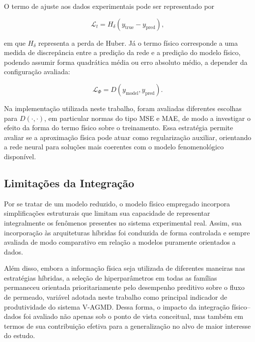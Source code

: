 O termo de ajuste aos dados experimentais pode ser representado por

\begin{equation}
\mathcal{L}_{t} = H_{\delta}(y_{\text{true}} - y_{\text{pred}}),
\end{equation}

\noindent em que \(H_{\delta}\) representa a perda de Huber. Já o termo físico corresponde a uma medida de discrepância entre a predição da rede e a predição do modelo físico, podendo assumir forma quadrática média ou erro absoluto médio, a depender da configuração avaliada:

\begin{equation}
\mathcal{L}_{\Phi} = D(y_{\text{model}}, y_{\text{pred}}).
\end{equation}

Na implementação utilizada neste trabalho, foram avaliadas diferentes escolhas para \(D(\cdot,\cdot)\), em particular normas do tipo MSE e MAE, de modo a investigar o efeito da forma do termo físico sobre o treinamento. Essa estratégia permite avaliar se a aproximação física pode atuar como regularização auxiliar, orientando a rede neural para soluções mais coerentes com o modelo fenomenológico disponível.
\subsection{Limitações da Integração}

Por se tratar de um modelo reduzido, o modelo físico empregado incorpora simplificações estruturais que limitam sua capacidade de representar integralmente os fenômenos presentes no sistema experimental real. Assim, sua incorporação às arquiteturas híbridas foi conduzida de forma controlada e sempre avaliada de modo comparativo em relação a modelos puramente orientados a dados.

Além disso, embora a informação física seja utilizada de diferentes maneiras nas estratégias híbridas, a seleção de hiperparâmetros em todas as famílias permaneceu orientada prioritariamente pelo desempenho preditivo sobre o fluxo de permeado, variável adotada neste trabalho como principal indicador de produtividade do sistema V-AGMD. Dessa forma, o impacto da integração físico--dados foi avaliado não apenas sob o ponto de vista conceitual, mas também em termos de sua contribuição efetiva para a generalização no alvo de maior interesse do estudo.
